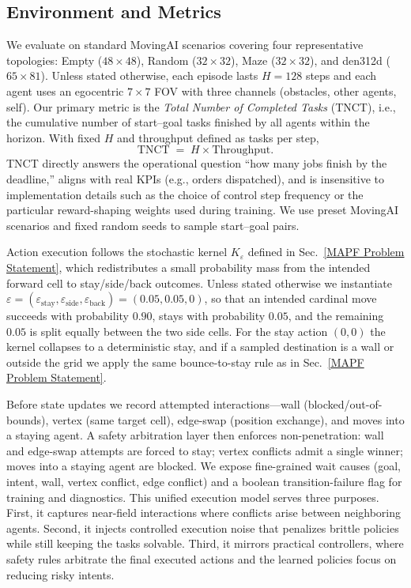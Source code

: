 \documentclass[conference]{IEEEtran}
\begin{document}
\subsection{Environment and Metrics}

We evaluate on standard MovingAI scenarios \cite{sturtevant2012benchmarks} covering four representative
topologies: Empty ($48{\times}48$), Random ($32{\times}32$), Maze
($32{\times}32$), and den312d ($65{\times}81$).
Unless stated otherwise, each episode lasts $H{=}128$ steps and each agent
uses an egocentric $7{\times}7$ FOV with three channels (obstacles, other
agents, self).
Our primary metric is the \emph{Total Number of Completed Tasks} (TNCT),
i.e., the cumulative number of start--goal tasks finished by all agents within
the horizon.
With fixed $H$ and throughput defined as tasks per step,
\begin{equation}
\text{TNCT} \;=\; H \times \text{Throughput}.
\end{equation}
TNCT directly answers the operational question ``how many jobs finish by the
deadline,'' aligns with real KPIs (e.g., orders dispatched), and is insensitive to implementation details such as the choice of control step frequency or the particular reward-shaping weights used during training. We use preset MovingAI scenarios and fixed random seeds to sample start–goal pairs.

Action execution follows the stochastic kernel $K_{\varepsilon}$ defined in
Sec.~\ref{MAPF Problem Statement}, which redistributes a small probability mass from the intended forward
cell to stay/side/back outcomes.
Unless stated otherwise we instantiate
\(\varepsilon = (\varepsilon_{\mathrm{stay}},\varepsilon_{\mathrm{side}},
\varepsilon_{\mathrm{back}}) = (0.05, 0.05, 0)\),
so that an intended cardinal move succeeds with probability $0.90$, stays
with probability $0.05$, and the remaining $0.05$ is split equally between
the two side cells.
For the stay action $(0,0)$ the kernel collapses to a deterministic stay,
and if a sampled destination is a wall or outside the grid we apply the same
bounce-to-stay rule as in Sec.~\ref{MAPF Problem Statement}.

Before state updates we record attempted interactions---wall
(blocked/out-of-bounds), vertex (same target cell), edge-swap (position
exchange), and moves into a staying agent.
A safety arbitration layer then enforces non-penetration: wall and edge-swap
attempts are forced to stay; vertex conflicts admit a single winner; moves
into a staying agent are blocked.
We expose fine-grained wait causes (goal, intent, wall, vertex conflict, edge
conflict) and a boolean transition-failure flag for training and diagnostics.
This unified execution model serves three purposes. First, it captures near-field interactions where conflicts arise between neighboring agents. Second, it injects controlled execution noise that penalizes brittle policies while still keeping the tasks solvable. Third, it mirrors practical controllers, where safety rules arbitrate the final executed actions and the learned policies focus on reducing risky intents.
\end{document}
